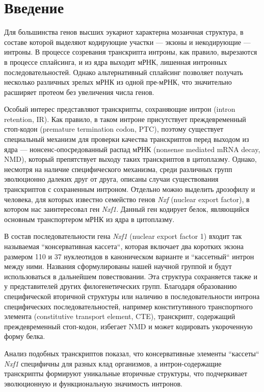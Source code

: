 \clearpage
\section{Введение}

Для большинства генов высших эукариот характерна мозаичная структура, в составе которой выделяют кодирующие участки — экзоны и некодирующие — интроны.
В процессе созревания транскрипта интроны, как правило, вырезаются в процессе сплайсинга, и из ядра выходит мРНК, лишенная интронных последовательностей.
Однако альтернативный сплайсинг позволяет получать несколько различных зрелых мРНК из одной пре-мРНК, что значительно расширяет протеом без увеличения числа генов.

Особый интерес представляют транскрипты, сохраняющие интрон (intron reten\-tion, IR).
Как правило, в таком интроне присутствует преждевременный стоп-кодон (pre\-mature termination codon, PTC), поэтому существует специальный механизм для проверки качества транскриптов перед выходом из ядра — нонсенс-опосредованный распад мРНК (nonsense mediated mRNA decay, NMD), который препятствует выходу таких транскриптов в цитоплазму.
Однако, несмотря на наличие специфического механизма, среди различных групп эволюционно далеких друг от друга, описаны случаи существования транскриптов с сохраненным интроном.
Отдельно можно выделить дрозофилу и человека, для которых известно семейство генов \textit{Nxf} (nuclear export factor), в котором нас заинтересовал ген \textit{Nxf1}.
Данный ген кодирует белок, являющийся основным транспортером мРНК из ядра в цитоплазму.

В состав последовательности гена \textit{Nxf1} (nuclear export factor 1) входит так называемая ``консервативная кассета``, которая включает два коротких экзона размером 110 и 37 нуклеотидов в каноническом варианте и ``кассетный`` интрон между ними.
Названия сформулированы нашей научной группой и будут использоваться в дальнейшем повествовании.
Эта структура сохраняется также и у представителей других филогенетических групп.
Благодаря образованию специфической вторичной структуры или наличию в последовательности интрона специфических последовательностей, например конститутивного транспортного элемента (constitutive transport element, CTE), транскрипт, содержащий преждевременный стоп-кодон, избегает NMD и может кодировать укороченную форму белка.

Анализ подобных транскриптов показал, что консервативные элементы ``кассеты`` \textit{Nxf1} специфичны для разных клад организмов, а интрон-содержащие транскрипты формируют уникальные вторичные структуры, что подчеркивает эволюционную и функциональную значимость интронов.

